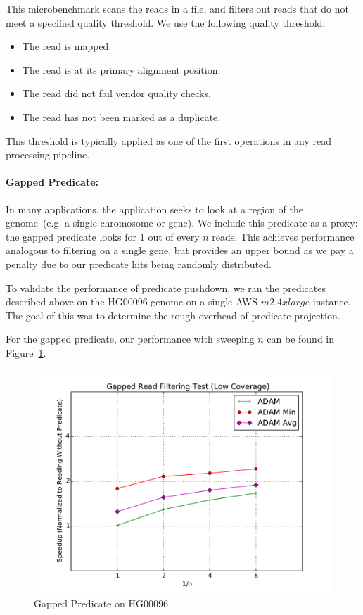 \documentclass[10pt,twocolumn]{article}
\theoremstyle{plain}
\begin{document}
This microbenchmark scans the reads in a file, and filters out reads that do not meet a specified quality threshold. We use the following
quality threshold:

\begin{itemize}
\item The read is mapped.
\item The read is at its primary alignment position.
\item The read did not fail vendor quality checks.
\item The read has not been marked as a duplicate.
\end{itemize}

This threshold is typically applied as one of the first operations in any read processing pipeline.

\paragraph{Gapped Predicate:}
\label{sec:gapped-predicate}

In many applications, the application seeks to look at a region of the genome~(e.g. a single chromosome or gene). We include this
predicate as a proxy: the gapped predicate looks for 1 out of every $n$ reads. This achieves performance analogous to filtering
on a single gene, but provides an upper bound as we pay a penalty due to our predicate hits being randomly distributed.

To validate the performance of predicate pushdown, we ran the predicates described above on the HG00096 genome on a
single AWS $m2.4xlarge$ instance. The goal of this was to determine the rough overhead of predicate projection.

For the gapped predicate, our performance with sweeping $n$ can be found in Figure~\ref{fig:gapped-filter}.

\begin{figure}[h]
\begin{center}
\includegraphics[width=\linewidth]{microbenchmarks/gapped_predicate_low_coverage.pdf}
\end{center}
\caption{Gapped Predicate on HG00096}
\label{fig:gapped-filter}
\end{figure}
\end{document}

